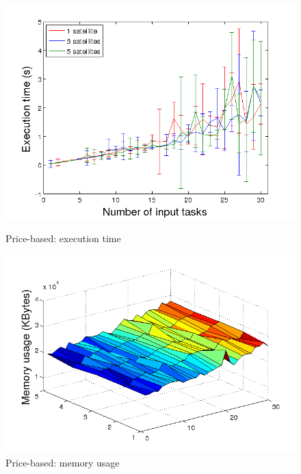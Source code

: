 \begin{figure}[h!]
  \begin{minipage}[b]{0.5\linewidth}
    \includegraphics[width=\linewidth]{Figures/tMB_sw_2.png}
    \caption{Price-based: execution time}\label{fig_tMB_sw}
  \end{minipage} 
  \begin{minipage}[b]{0.5\linewidth}
    \includegraphics[width=\linewidth]{Figures/mMB_sw.png} 
    \caption{Price-based: memory usage}\label{fig_mMB_sw}
  \end{minipage} 
\end{figure}
